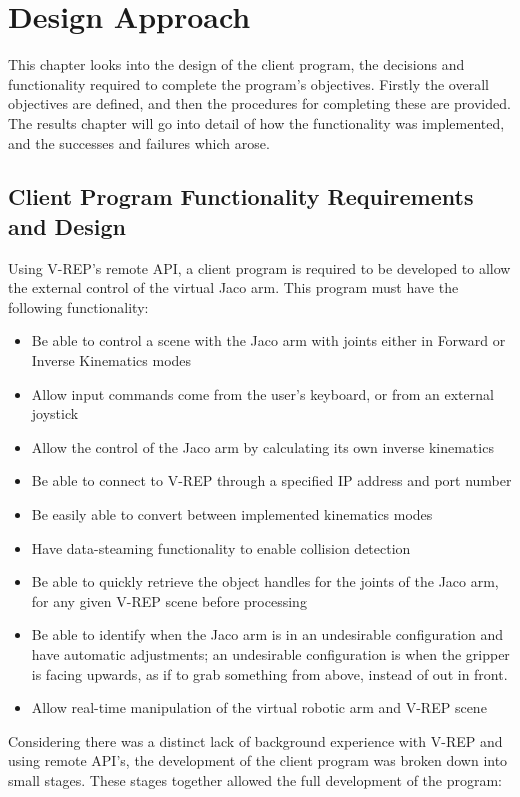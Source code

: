 \documentclass[12pt,openany,a4paper]{book}
\begin{document}
\chapter{Design Approach}

This chapter looks into the design of the client program, the decisions and functionality required to complete the program's objectives. Firstly the overall objectives are defined, and then the procedures for completing these are provided. The results chapter will go into detail of how the functionality was implemented, and the successes and failures which arose.

\section{Client Program Functionality Requirements and Design}
Using V-REP's remote API, a client program is required to be developed to allow the external control of the virtual Jaco arm. This program must have the following functionality:

\begin{itemize}
	\item Be able to control a scene with the Jaco arm with joints either in Forward or Inverse Kinematics modes
	\item Allow input commands come from the user's keyboard, or from an external joystick
	\item Allow the control of the Jaco arm by calculating its own inverse kinematics
	\item Be able to connect to V-REP through a specified IP address and port number
	\item Be easily able to convert between implemented kinematics modes
	\item Have data-steaming functionality to enable collision detection
	\item Be able to quickly retrieve the object handles for the joints of the Jaco arm, for any given V-REP scene before processing
	\item Be able to identify when the Jaco arm is in an undesirable configuration and have automatic adjustments; an undesirable configuration is when the gripper is facing upwards, as if to grab something from above, instead of out in front.
	\item Allow real-time manipulation of the virtual robotic arm and V-REP scene
\end{itemize}


Considering there was a distinct lack of background experience with V-REP and using remote API's, the development of the client program was broken down into small stages. These stages together allowed the full development of the program:
\end{document}
